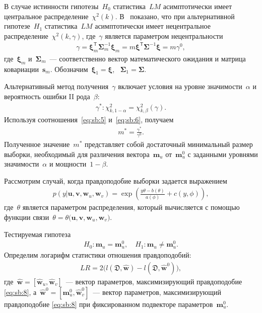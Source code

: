 В случае истинности гипотезы~$H_0$ статистика~$LM$ асимптотически имеет центральное распределение~$\chi^2(k)$. В~\cite{self1988} показано, что при альтернативной гипотезе~$H_1$ статистика~$LM$ асимптотически имеет нецентральное распределение~$\chi^2(k,\gamma)$, где~$\gamma$ является параметром нецентральности
\[
\label{eq:sb:5}
\begin{aligned}
	\gamma = \bm{\xi}_{m}^{\mathsf{T}}\bm{\Sigma}^{-1}_{m}\bm{\xi}_{m} = m\bm{\xi}^{\mathsf{T}}\bm{\Sigma}^{-1}\bm{\xi}= m\gamma^0,
\end{aligned}
\]
где~$\bm{\xi}_{m}$ и~$\bm{\Sigma}_{m}$~--- соответственно вектор математического ожидания и матрица ковариации~$\textbf{s}_{m}$. Обозначим~$\bm{\xi}_1 = \bm{\xi}$, ~$\bm{\Sigma}_1 = \bm{\Sigma}$.

Альтернативный метод получения~$\gamma$ включает условия на уровне значимости~$\alpha$ и вероятность ошибки II рода~$\beta$:
\[
\label{eq:sb:6}
\begin{aligned}
	\gamma^*:\chi^2_{k, 1-\alpha} = \chi^2_{k, \beta}\left(\gamma\right).
\end{aligned}
\]
Используя соотношения~\eqref{eq:sb:5} и~\eqref{eq:sb:6}, получаем
\[
\label{eq:sb:7}
\begin{aligned}
	m^* = \frac{\gamma^*}{\gamma^0}.
\end{aligned}
\]
Полученное значение~$m^*$ представляет собой достаточный минимальный размер выборки, необходимый для различения вектора~$\textbf{m}_{u}$ от~$\textbf{m}^0_{u}$ с заданными уровнями значимости~$\alpha$ и мощности~$1-\beta$.

Рассмотрим случай, когда правдоподобие выборки задается выражением
\[
\label{eq:sb:8}
\begin{aligned}
	p(y|\textbf{u},\textbf{v},\textbf{w}_{u},\textbf{w}_{v}) = \exp\left(\frac{y\theta- b(\theta)}{a(\phi)} + c\left(y, \phi\right)\right),
\end{aligned}
\]
где~$\theta$ является параметром распределения, который вычисляется с помощью функции связи~$\theta=\theta\bigr(\textbf{u},\textbf{v},\textbf{w}_{u},\textbf{w}_{v}\bigr)$.

Тестируемая гипотеза
\[
\label{eq:sb:9}
\begin{aligned}
	H_0: \textbf{m}_{u} = \textbf{m}^0_{u}, \quad H_1: \textbf{m}_{u} \not= \textbf{m}^0_{u}.
\end{aligned}
\]
Определим логарифм статистики отношения правдоподобий:
\[
\label{eq:sb:10}
\begin{aligned}
	LR = 2\Big(l\left(\mathfrak{D}, \hat{\textbf{w}}\right) - l\left(\mathfrak{D}, \hat{\textbf{w}}^0\right)\Big),
\end{aligned}
\]
где~$\hat{\textbf{w}} = [\hat{\textbf{w}}_{u},\hat{\textbf{w}}_{v}]$~--- вектор параметров, максимизирующий правдоподобие \eqref{eq:sb:8}, а~$\hat{\textbf{w}}^{0} = [\textbf{m}^{0}_{u},\hat{\textbf{w}}^{0}_{v}]$~--- вектор параметров, максимизирующий правдоподобие \eqref{eq:sb:8} при фиксированном подвекторе параметров~$\textbf{m}^{0}_{u}$.

